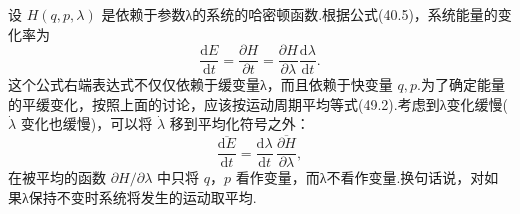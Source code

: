 设 $H(q,p,\lambda)$
是依赖于参数λ的系统的哈密顿函数.根据公式(40.5)，系统能量的变化率为
\begin{equation}
  \frac{\mathrm{d}E}{\mathrm{d}t}=\frac{\partial H}{\partial t}
  =\frac{\partial H}{\partial\lambda}\frac{\mathrm{d}\lambda}{\mathrm{d}t}.
\end{equation}
这个公式右端表达式不仅仅依赖于缓变量λ，而且依赖于快变量 $q,p$.为了确定能量的平缓变化，按照上面的讨论，应该按运动周期平均等式(49.2).考虑到λ变化缓慢(
$\dot{\lambda}$ 变化也缓慢)，可以将 $\dot{\lambda}$
移到平均化符号之外：
\begin{equation}
  \overline{\frac{\mathrm{d}E}{\mathrm{d}t}}
  =\frac{\mathrm{d}\lambda}{\mathrm{d}t}\,
  \overline{\frac{\partial H}{\partial\lambda}},
\end{equation}
在被平均的函数 $\partial H/\partial\lambda$ 中只将 $q$，$p$
看作变量，而λ不看作变量.换句话说，对如果λ保持不变时系统将发生的运动取平均.


